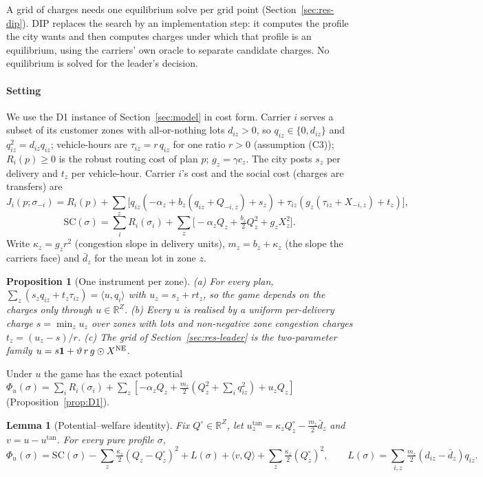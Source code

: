 \documentclass[preprint,11pt]{elsarticle}
\newtheorem{lemma}[theorem]{Lemma}
\newtheorem{proposition}[theorem]{Proposition}
\theoremstyle{definition}
\theoremstyle{remark}
\newcommand{\R}{\mathbb{R}}
\newcommand{\ip}[2]{\langle #1,#2\rangle}
\begin{document}
A grid of charges needs one equilibrium solve per grid point (Section~\ref{sec:res-dip}). DIP replaces the search by an implementation step: it computes the profile the city wants and then computes charges under which that profile is an equilibrium, using the carriers' own oracle to separate candidate charges. No equilibrium is solved for the leader's decision.

\paragraph{Setting} We use the D1 instance of Section~\ref{sec:model} in cost form. Carrier $i$ serves a subset of its customer zones with all-or-nothing lots $d_{iz}>0$, so $q_{iz}\in\{0,d_{iz}\}$ and $q_{iz}^2=d_{iz}q_{iz}$; vehicle-hours are $\tau_{iz}=r\,q_{iz}$ for one ratio $r>0$ (assumption (C3)); $R_i(p)\ge0$ is the robust routing cost of plan $p$; $g_z=\gamma c_z$. The city posts $s_z$ per delivery and $t_z$ per vehicle-hour. Carrier $i$'s cost and the social cost (charges are transfers) are
\[
J_i(p;\sigma_{-i})=R_i(p)+\sum_z\big[q_{iz}(-\alpha_z+b_z(q_{iz}+Q_{-i,z})+s_z)+\tau_{iz}(g_z(\tau_{iz}+X_{-i,z})+t_z)\big],
\]
\[
\mathrm{SC}(\sigma)=\sum_iR_i(\sigma_i)+\sum_z\big[-\alpha_zQ_z+\tfrac{b_z}{2}Q_z^2+g_zX_z^2\big].
\]
Write $\kappa_z=g_zr^2$ (congestion slope in delivery units), $m_z=b_z+\kappa_z$ (the slope the carriers face) and $\bar d_z$ for the mean lot in zone $z$.

\begin{proposition}[One instrument per zone]\label{prop:instr}
(a) For every plan, $\sum_z(s_zq_{iz}+t_z\tau_{iz})=\ip{u}{q_i}$ with $u_z=s_z+rt_z$, so the game depends on the charges only through $u\in\R^Z$. (b) Every $u$ is realised by a uniform per-delivery charge $s=\min_zu_z$ over zones with lots and non-negative zone congestion charges $t_z=(u_z-s)/r$. (c) The grid of Section~\ref{sec:res-leader} is the two-parameter family $u=s\mathbf 1+\vartheta\,r\,g\odot X^{\rm NE}$.
\end{proposition}

Under $u$ the game has the exact potential $\Phi_u(\sigma)=\sum_iR_i(\sigma_i)+\sum_z[-\alpha_zQ_z+\tfrac{m_z}{2}(Q_z^2+\sum_iq_{iz}^2)+u_zQ_z]$ (Proposition~\ref{prop:D1}).

\begin{lemma}[Potential--welfare identity]\label{lem:identity}
Fix $Q^\circ\in\R^Z$, let $u^{\tan}_z=\kappa_zQ^\circ_z-\tfrac{m_z}{2}\bar d_z$ and $v=u-u^{\tan}$. For every pure profile $\sigma$,
\[
\Phi_u(\sigma)=\mathrm{SC}(\sigma)-\sum_z\tfrac{\kappa_z}{2}(Q_z-Q^\circ_z)^2+L(\sigma)+\ip{v}{Q}+\sum_z\tfrac{\kappa_z}{2}(Q^\circ_z)^2,\qquad L(\sigma)=\sum_{i,z}\tfrac{m_z}{2}(d_{iz}-\bar d_z)q_{iz}.
\]
\end{lemma}
\end{document}
